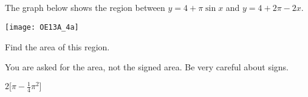 







\subsection*{\Application}

\begin{Mquestion}[2013A]\label{prob_s1.5q5}
The graph below shows the region between
$y = 4 + \pi \sin x$ and $y = 4 + 2\pi - 2x$.

\begin{center}
       \texttt{[image: OE13A\_4a]}
\end{center}

\noindent Find the area of this region.
\end{Mquestion}

\begin{hint}
You are asked for the area, not the signed area. Be very careful about signs.
\end{hint}

\begin{answer}
$2\Big[\pi-\frac{1}{4}\pi^2\Big]$
\end{answer}

